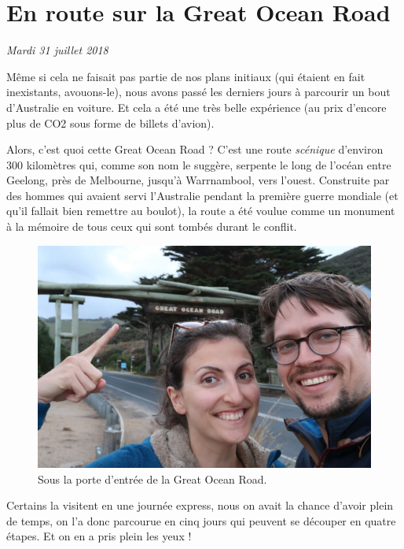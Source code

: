 \hypertarget{en-route-sur-la-great-ocean-road}{%
\section{En route sur la Great Ocean
Road}\label{en-route-sur-la-great-ocean-road}}

\emph{Mardi 31 juillet 2018}

Même si cela ne faisait pas partie de nos plans initiaux (qui étaient en
fait inexistants, avouons-le), nous avons passé les derniers jours à
parcourir un bout d'Australie en voiture. Et cela a été une très belle
expérience (au prix d'encore plus de CO2 sous forme de billets d'avion).

Alors, c'est quoi cette Great Ocean Road ? C'est une route
\emph{scénique} d'environ 300 kilomètres qui, comme son nom le suggère,
serpente le long de l'océan entre Geelong, près de Melbourne, jusqu'à
Warrnambool, vers l'ouest. Construite par des hommes qui avaient servi
l'Australie pendant la première guerre mondiale (et qu'il fallait bien
remettre au boulot), la route a été voulue comme un monument à la
mémoire de tous ceux qui sont tombés durant le conflit.

\begin{figure}
\centering
\includegraphics{images/20180731_greatoceanroad.JPG}
\caption{Sous la porte d'entrée de la Great Ocean Road.}
\end{figure}

Certains la visitent en une journée express, nous on avait la chance
d'avoir plein de temps, on l'a donc parcourue en cinq jours qui peuvent
se découper en quatre étapes. Et on en a pris plein les yeux !

